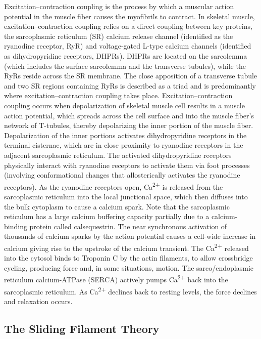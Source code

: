 Excitation--contraction coupling is the process by which a muscular action potential in the muscle fiber causes the myofibrils to contract. In skeletal muscle, excitation--contraction coupling relies on a direct coupling between key proteins, the sarcoplasmic reticulum (SR) calcium release channel (identified as the ryanodine receptor, RyR) and voltage-gated L-type calcium channels (identified as dihydropyridine receptors, DHPRs). DHPRs are located on the sarcolemma (which includes the surface sarcolemma and the transverse tubules), while the RyRs reside across the SR membrane. The close apposition of a transverse tubule and two SR regions containing RyRs is described as a triad and is predominantly where excitation--contraction coupling takes place. Excitation--contraction coupling occurs when depolarization of skeletal muscle cell results in a muscle action potential, which spreads across the cell surface and into the muscle fiber's network of T-tubules, thereby depolarizing the inner portion of the muscle fiber. Depolarization of the inner portions activates dihydropyridine receptors in the terminal cisternae, which are in close proximity to ryanodine receptors in the adjacent sarcoplasmic reticulum. The activated dihydropyridine receptors physically interact with ryanodine receptors to activate them via foot processes (involving conformational changes that allosterically activates the ryanodine receptors). As the ryanodine receptors open, Ca\textsuperscript{2+} is released from the sarcoplasmic reticulum into the local junctional space, which then diffuses into the bulk cytoplasm to cause a calcium spark. Note that the sarcoplasmic reticulum has a large calcium buffering capacity partially due to a calcium-binding protein called calsequestrin. The near synchronous activation of thousands of calcium sparks by the action potential causes a cell-wide increase in calcium giving rise to the upstroke of the calcium transient. The Ca\textsuperscript{2+} released into the cytosol binds to Troponin C by the actin filaments, to allow crossbridge cycling, producing force and, in some situations, motion. The sarco/endoplasmic reticulum calcium-ATPase (SERCA) actively pumps Ca\textsuperscript{2+} back into the sarcoplasmic reticulum. As Ca\textsuperscript{2+} declines back to resting levels, the force declines and relaxation occurs.

\hypertarget{the-sliding-filament-theory}{%
\subsection{The Sliding Filament Theory}\label{the-sliding-filament-theory}}

